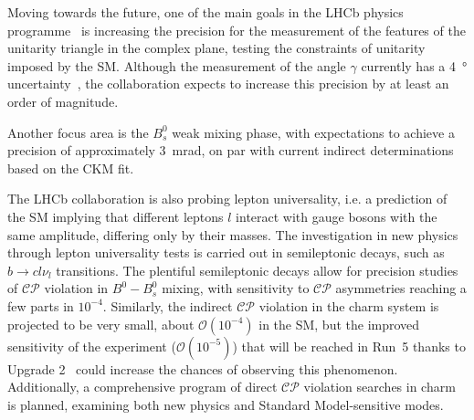 

Moving towards the future, one of the main goals in the LHCb physics programme~\cite{CERN-LHCC-2021-012} is increasing the precision for the measurement of the features of the unitarity triangle in the complex plane, testing the constraints of unitarity imposed by the SM. 
Although the measurement of the angle $\gamma$ currently has a \SI{4}{\degree} uncertainty~\cite{LHCb:2021dcr}, the collaboration expects to increase this precision by at least an order of magnitude. 

Another focus area is the $B_s^0$ weak mixing phase, with expectations to achieve a precision of approximately \SI{3}{\milli\radian}, on par with current indirect determinations based on the CKM fit.

The LHCb collaboration is also probing lepton universality, i.e. a prediction of the SM implying that different leptons $l$ interact with gauge bosons with the same amplitude, differing only by their masses.
The investigation in new physics through lepton universality tests is carried out in semileptonic decays, such as $b\rightarrow c l\nu_l$ transitions. The plentiful semileptonic decays allow for precision studies of $\mathcal{CP}$ violation in $B^0-B^0_s$ mixing, with sensitivity to $\mathcal{CP}$ asymmetries reaching a few parts in $10^{−4}$. Similarly, the indirect $\mathcal{CP}$ violation in the charm system is projected to be very small, about $\mathcal{O}(10^{-4})$ in the SM, but the improved sensitivity of the experiment ($\mathcal{O}(10^{-5})$) that will be reached in Run~5 thanks to Upgrade 2~\cite{lhcbcollaboration2019physics} could increase the chances of observing this phenomenon. Additionally, a comprehensive program of direct $\mathcal{CP}$ violation searches in charm is planned, examining both new physics and Standard Model-sensitive modes.

